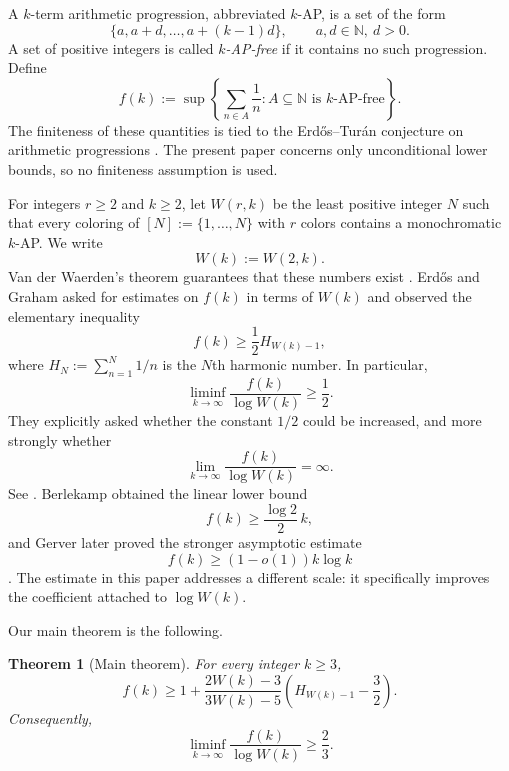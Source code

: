 \documentclass[11pt]{article}
\newtheorem{theorem}{Theorem}[section]
\theoremstyle{definition}
\theoremstyle{remark}
\newcommand{\N}{\mathbb{N}}
\begin{document}
A $k$-term arithmetic progression, abbreviated $k$-AP, is a set of the form
\[
 \{a,a+d,\ldots,a+(k-1)d\},
 \qquad a,d\in\N,\ d>0.
\]
A set of positive integers is called \emph{$k$-AP-free} if it contains no
such progression.  Define
\begin{equation}\label{eq:def-f}
 f(k):=\sup\left\{
   \sum_{n\in A}\frac1n:
   A\subseteq\N\text{ is $k$-AP-free}
 \right\}.
\end{equation}
The finiteness of these quantities is tied to the Erd\H{o}s--Tur\'an
conjecture on arithmetic progressions \cite{erdos-turan-1936,gerver-1977}.
The present paper concerns only unconditional lower bounds, so no finiteness
assumption is used.

For integers $r\ge 2$ and $k\ge 2$, let $W(r,k)$ be the least positive
integer $N$ such that every coloring of $[N]:=\{1,\ldots,N\}$ with $r$
colors contains a monochromatic $k$-AP.  We write
\[
 W(k):=W(2,k).
\]
Van der Waerden's theorem guarantees that these numbers exist
\cite{vanderwaerden-1927}.  Erd\H{o}s and Graham asked for estimates on
$f(k)$ in terms of $W(k)$ and observed the elementary inequality
\begin{equation}\label{eq:classical-half-intro}
 f(k)\ge \frac12 H_{W(k)-1},
\end{equation}
where $H_N:=\sum_{n=1}^N1/n$ is the $N$th harmonic number.  In particular,
\[
 \liminf_{k\to\infty}\frac{f(k)}{\log W(k)}\ge\frac12.
\]
They explicitly asked whether the constant $1/2$ could be increased, and
more strongly whether
\begin{equation}\label{eq:erdos-question}
 \lim_{k\to\infty}\frac{f(k)}{\log W(k)}=\infty.
\end{equation}
See \cite{erdos-graham-1979,erdos-graham-1980,erdos-problems-169}.
Berlekamp obtained the linear lower bound
\[
 f(k)\ge \frac{\log 2}{2}\,k,
\]
and Gerver later proved the stronger asymptotic estimate
\begin{equation}\label{eq:gerver}
 f(k)\ge (1-o(1))k\log k
\end{equation}
\cite{berlekamp-1968,gerver-1977}.  The estimate in this paper addresses a
different scale: it specifically improves the coefficient attached to
$\log W(k)$.

Our main theorem is the following.

\begin{theorem}[Main theorem]\label{thm:main}
For every integer $k\ge 3$,
\begin{equation}\label{eq:main-exact}
 f(k)\ge
 1+\frac{2W(k)-3}{3W(k)-5}
 \left(H_{W(k)-1}-\frac32\right).
\end{equation}
Consequently,
\begin{equation}\label{eq:main-asymptotic}
 \liminf_{k\to\infty}\frac{f(k)}{\log W(k)}\ge\frac23.
\end{equation}
\end{theorem}
\end{document}
